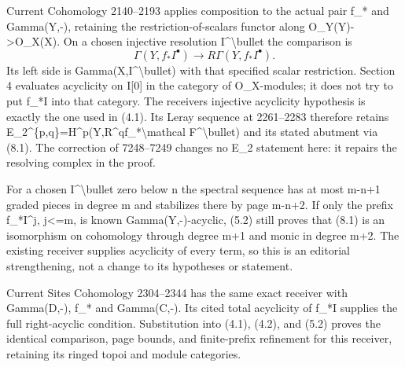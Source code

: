 \documentclass[11pt]{article}
\begin{document}
Current Cohomology 2140–\allowbreak{}2193 applies composition to the actual pair f\_\allowbreak{}* and Gamma(Y,\allowbreak{}-)\allowbreak{},\allowbreak{} retaining the restriction-of-scalars functor along O\_\allowbreak{}Y(Y)\allowbreak{}\allowbreak{}->O\_\allowbreak{}X(X)\allowbreak{}. On a chosen injective resolution I\^{}\textbackslash bullet the comparison is \[
 \Gamma(Y,f_*I^\bullet)
     \longrightarrow R\Gamma(Y,f_*I^\bullet).
                                                               \tag{8.1}
\] Its left side is Gamma(X,\allowbreak{}I\textasciicircum{}\textbackslash{}bullet)\allowbreak{} with that specified scalar restriction. Section 4 evaluates acyclicity on I[0]\allowbreak{} in the category of O\_\allowbreak{}X-modules; it does not try to put f\_\allowbreak{}*I into that category. The receiver\textquotesingle s injective acyclicity hypothesis is exactly the one used in (4.1)\allowbreak{}. Its Leray sequence at 2261–\allowbreak{}2283 therefore retains E\_\allowbreak{}2\textasciicircum{}\{p,\allowbreak{}q\}\allowbreak{}=H\textasciicircum{}p(Y,\allowbreak{}R\textasciicircum{}qf\_\allowbreak{}*\textbackslash{}mathcal F\textasciicircum{}\textbackslash{}bullet)\allowbreak{} and its stated abutment via (8.1)\allowbreak{}. The correction of 7248–\allowbreak{}7249 changes no E\_\allowbreak{}2 statement here:\allowbreak{} it repairs the resolving complex in the proof.

For a chosen I\^{}\textbackslash bullet zero below n the spectral sequence has at most m-n\allowbreak{}+1 graded pieces in degree m and stabilizes there by page m-n\allowbreak{}+2. If only the prefix f\_\allowbreak{}*I\textasciicircum{}j,\allowbreak{} j<\allowbreak{}=m,\allowbreak{} is known Gamma(Y,\allowbreak{}-)\allowbreak{}-acyclic,\allowbreak{} (5.2)\allowbreak{} still proves that (8.1)\allowbreak{} is an isomorphism on cohomology through degree m\allowbreak{}+1 and monic in degree m\allowbreak{}+2. The existing receiver supplies acyclicity of every term,\allowbreak{} so this is an editorial strengthening,\allowbreak{} not a change to its hypotheses or statement.

Current Sites Cohomology 2304–\allowbreak{}2344 has the same exact receiver with Gamma(D,\allowbreak{}-)\allowbreak{},\allowbreak{} f\_\allowbreak{}* and Gamma(C,\allowbreak{}-)\allowbreak{}. Its cited total acyclicity of f\_\allowbreak{}*I supplies the full right-acyclic condition. Substitution into (4.1)\allowbreak{},\allowbreak{} (4.2)\allowbreak{},\allowbreak{} and (5.2)\allowbreak{} proves the identical comparison,\allowbreak{} page bounds,\allowbreak{} and finite-prefix refinement for this receiver,\allowbreak{} retaining its ringed topoi and module categories.
\end{document}
